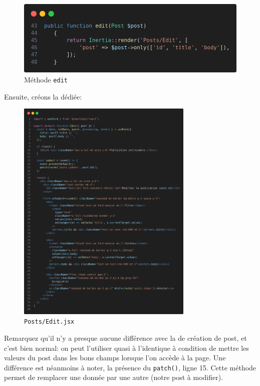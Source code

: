\begin{figure}[!h]
    \centering
    \includegraphics[width=0.8\linewidth]{figures-C1/postscontroller_edit.png}
    \caption{Méthode \texttt{edit}}
    \label{fig:posts-methode-edit}
\end{figure}
\newpage
Ensuite, créons la \view{} dédiée:
\begin{figure}[!h]
    \centering
    \includegraphics[width=0.75\textwidth]{figures-C1/posts_edit.png}
    \caption{\texttt{Posts/Edit.jsx}}
\end{figure}

Remarquez qu'il n'y a presque aucune différence avec la \view{} de création de post, et c'est bien normal: on peut l'utiliser quasi à l'identique à condition de mettre les valeurs du post dans les bons champs lorsque l'on accède à la page. Une différence est néanmoins à noter, la présence du \verb|patch()|, ligne 15. Cette méthode permet de remplacer une donnée par une autre (notre post à modifier).

\label{sec:posts_update}

